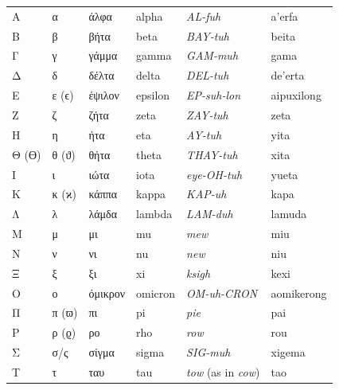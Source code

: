 \documentclass[../libro.tex]{subfiles}
\begin{document}
\begin{longtable}[c]{llllll}
    Α     & α     & άλφα    & alpha   & \textit{AL-fuh}                   & \textsf{a'erfa}     \\
    Β     & β     & βήτα    & beta    & \textit{BAY-tuh}                  & \textsf{beita}      \\
    Γ     & γ     & γάμμα   & gamma   & \textit{GAM-muh}                  & \textsf{gama}       \\
    Δ     & δ     & δέλτα   & delta   & \textit{DEL-tuh}                  & \textsf{de'erta}    \\
    Ε     & ε (ϵ) & έψιλον  & epsilon & \textit{EP-suh-lon}               & \textsf{aipuxilong} \\
    Ζ     & ζ     & ζήτα    & zeta    & \textit{ZAY-tuh}                  & \textsf{zeta}       \\
    Η     & η     & ήτα     & eta     & \textit{AY-tuh}                   & \textsf{yita}       \\
    Θ (ϴ) & θ (ϑ) & θήτα    & theta   & \textit{THAY-tuh}                 & \textsf{xita}       \\
    Ι     & ι     & ιώτα    & iota    & \textit{eye-OH-tuh}               & \textsf{yueta}      \\
    Κ     & κ (ϰ) & κάππα   & kappa   & \textit{KAP-uh}                   & \textsf{kapa}       \\
    Λ     & λ     & λάμδα   & lambda  & \textit{LAM-duh}                  & \textsf{lamuda}     \\
    Μ     & μ     & μι      & mu      & \textit{mew}                      & \textsf{miu}        \\
    Ν     & ν     & νι      & nu      & \textit{new}                      & \textsf{niu}        \\
    Ξ     & ξ     & ξι      & xi      & \textit{ksigh}                    & \textsf{kexi}       \\
    Ο     & ο     & όμικρον & omicron & \textit{OM-uh-CRON}               & \textsf{aomikerong} \\
    Π     & π (ϖ) & πι      & pi      & \textit{pie}                      & \textsf{pai}        \\
    Ρ     & ρ (ϱ) & ρο      & rho     & \textit{row}                      & \textsf{rou}        \\
    Σ     & σ/ς   & σίγμα   & sigma   & \textit{SIG-muh}                  & \textsf{xigema}     \\
    Τ     & τ     & ταυ     & tau     & \textit{tow} (as in \textit{cow}) & \textsf{tao}        \\

\end{longtable}
\end{document}
